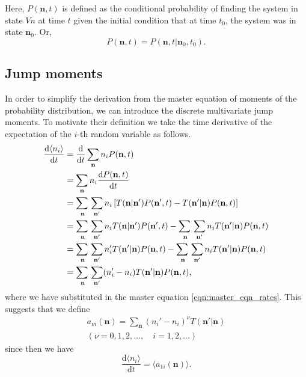 \documentclass[a4paper,11pt]{article}
\numberwithin{equation}{section}
\newcommand{\diff}[2]{\frac{\mathrm{d} #1}{\mathrm{d} #2}}
\newcommand{\V}[1]{\mathbf{#1}}
\newcommand{\E}[1]{\langle #1 \rangle}
\begin{document}
Here, \(P(\V{n},t)\) is defined as the conditional probability of finding the
system in state \(V{n}\) at time \(t\) given the initial condition that at time
\(t_0\), the system was in state \(\V{n}_0\). Or,
\begin{equation*}
    P(\V{n},t) = P(\V{n},t | \V{n}_0, t_0).
\end{equation*}

\subsection{Jump moments}
In order to simplify the derivation from the master equation of moments of the
probability distribution, we can introduce the discrete multivariate jump
moments. To motivate their definition we take the time derivative of the
expectation of the \(i\)-th random variable as follows.
\begin{align*}
    \diff{\E{n_i}}{t} &= \diff{}{t}\sum_{\V{n}}n_i P(\V{n},t)\\
    &= \sum_{\V{n}}n_i \diff{P(\V{n},t)}{t}\\
    &= \adjustlimits\sum_{\V{n}}\sum_{\V{n}'} n_i \left[ T(\V{n}|\V{n}') P(\V{n}',t) -
    T(\V{n}'|\V{n}) P(\V{n},t)\right]\\
    &= \adjustlimits\sum_{\V{n}}\sum_{\V{n}'} n_i T(\V{n}|\V{n}') P(\V{n}',t) -
    \adjustlimits\sum_{\V{n}}\sum_{\V{n}'} n_i T(\V{n}'|\V{n}) P(\V{n},t)\\
    &= \adjustlimits\sum_{\V{n}}\sum_{\V{n}'} n_i' T(\V{n}'|\V{n}) P(\V{n},t) -
    \adjustlimits\sum_{\V{n}}\sum_{\V{n}'} n_i T(\V{n}'|\V{n}) P(\V{n},t)\\
    &= \adjustlimits\sum_{\V{n}}\sum_{\V{n}'} (n_i' - n_i) T(\V{n}'|\V{n})
    P(\V{n},t),
\end{align*}
where we have substituted in the master equation \eqref{eqn:master_eqn_rates}.
This suggests that we define
\begin{equation}
    \begin{gathered}
        a_{\nu i}(\V{n}) = \sum_{\V{n}} (n_i'-n_i)^\nu T(\V{n}'|\V{n})\\
        (\nu = 0,1,2,\dotsc,\quad i=1,2,\dotsc)
    \end{gathered}
    \label{eqn:jump_moment}
\end{equation}
since then we have
\begin{equation}
    \diff{\E{n_i}}{t} = \E{a_{1i}(\V{n})}.
    \label{eqn:time_evo_expectation_jump_moment}
\end{equation}
\end{document}
